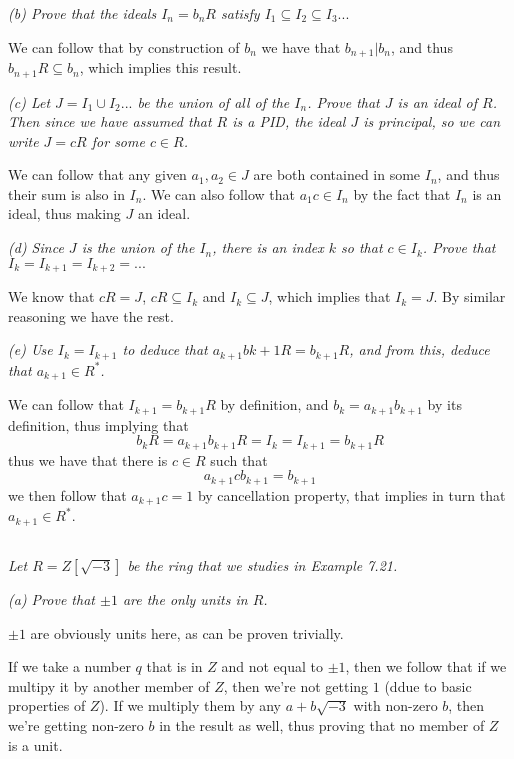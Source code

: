 \documentclass[11pt,oneside,titlepage]{book}
\begin{document}
\textit{(b) Prove that the ideals $I_n = b_nR$ satisfy $I_1 \subseteq
  I_2 \subseteq I_3 ... $}

We can follow that by construction of $b_n$ we have that $b_{n + 1} | b_n$,
and thus $b_{n + 1}R \subseteq  b_n$, which implies this result.

\textit{(c) Let $J = I_1 \cup I_2 ...$ be the union of all of the
  $I_n$. Prove that $J$ is an ideal of $R$. Then since we have assumed that
  $R$ is a PID, the ideal $J$ is principal, so we can write $J = cR$
  for some $c \in R$.}

We can follow that any given $a_1, a_2 \in J$ are both contained in
some $I_n$, and thus their sum is also in $I_n$. We can also
follow that $a_1 c \in I_n$ by the fact that $I_n$ is an ideal,
thus making $J$ an ideal.

\textit{(d) Since $J$ is the union of the $I_n$, there is an index $k$
  so that $c \in I_k$. Prove that $I_k = I_{k + 1} = I_{k + 2} = ...$}

We know that $cR = J$, $cR \subseteq I_k$ and $I_k \subseteq J$,
which implies that $I_k = J$. By similar reasoning we have the rest.

\textit{(e) Use $I_k = I_{k + 1}$ to deduce that $a_{k + 1}b{k + 1}R =
  b_{k + 1}R$, and from this, deduce that $a_{k + 1} \in R^*$.}

We can follow that $I_{k + 1} = b_{k + 1}R$ by definition, and
$b_k = a_{k + 1}b_{k + 1}$ by its definition, thus implying that
$$b_k R = a_{k + 1}b_{k + 1}R =  I_k = I_{k + 1} = b_{k + 1}R$$
thus we have that there is $c \in R$ such that
$$a_{k + 1}c b_{k + 1} = b_{k + 1}$$
we then follow that $a_{k + 1}c = 1$ by cancellation property, that
implies in turn that $a_{k + 1}\in R^*$.

\subsection{}

\textit{Let $R = Z[\sqrt{-3}]$ be the ring that we studies in Example 7.21.}

\textit{(a) Prove that $\pm 1$ are the only units in $R$.}

$\pm 1$ are obviously units here, as can be proven trivially.

If we take a number $q$ that is in $Z$ and not equal to $\pm 1$, then
we follow that if we multipy it by another member of $Z$, then we're
not getting $1$ (ddue to basic properties of $Z$). If we multiply them
by any $a + b\sqrt{-3}$ with non-zero $b$, then we're getting non-zero
$b$ in the result as well, thus proving that no member of $Z$ is a
unit.
\end{document}
